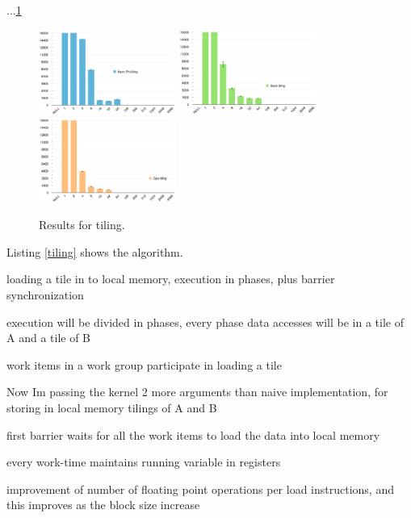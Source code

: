 \par{...\ref{tilingResults}}

\begin{figure}[!h]
    \centering
    \includegraphics[width=0.4\textwidth]{figures/phiTiling.png}
    \includegraphics[width=0.4\textwidth]{figures/xeonTiling.png}
    \includegraphics[width=0.4\textwidth]{figures/gpuTiling.png}
    \caption{Results for tiling.}
    \label{tilingResults}
\end{figure}

\par{Listing \ref{tiling} shows the algorithm.}

\par{loading a tile in to local memory, execution in phases, plus barrier synchronization }

\par{execution will be divided in phases, every phase data accesses will be in a tile of A and a tile of B}
\par{work items in a work group participate in loading a tile}
\par{Now Im passing the kernel 2 more arguments than naive implementation, for storing in local memory tilings of A and B}
\par{first barrier waits for all the work items to load the data into local memory}
\par{every work-time maintains running variable in registers}
\par{improvement of number of floating point operations per load instructions, and this improves as the block size increase}

